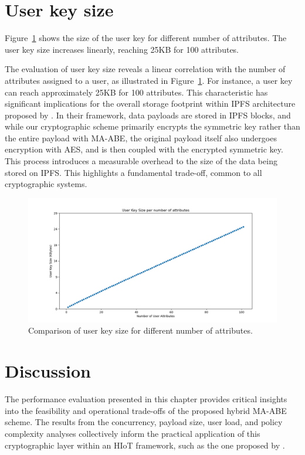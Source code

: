 \documentclass[cic,tc,english]{iiufrgs}
\numberwithin{algorithm}{chapter}
\begin{document}
        
        \section{User key size}
            \label{sec:keysize}
            Figure~\ref{fig:user_key_size} shows the size of the user key for different number of attributes. The user key size increases linearly, reaching 25KB for 100 attributes.

            The evaluation of user key size reveals a linear correlation with the number of attributes assigned to a user, as illustrated in Figure~\ref{fig:user_key_size}. For instance, a user key can reach approximately 25KB for 100 attributes. This characteristic has significant implications for the overall storage footprint within IPFS architecture proposed by \citet{laura2023}. In their framework, data payloads are stored in IPFS blocks, and while our cryptographic scheme primarily encrypts the symmetric key rather than the entire payload with MA-ABE, the original payload itself also undergoes encryption with AES, and is then coupled with the encrypted symmetric key. This process introduces a measurable overhead to the size of the data being stored on IPFS. This highlights a fundamental trade-off, common to all cryptographic systems.

            \begin{figure}
                \centering
                \includegraphics[width=\textwidth]{images/key_size_analysis/user_key_size_analysis.png}
                \caption{Comparison of user key size for different number of attributes.}
                \label{fig:user_key_size}
            \end{figure}


        \section{Discussion}
            \label{sec:discussion}
            The performance evaluation presented in this chapter provides critical insights into the feasibility and operational trade-offs of the proposed hybrid MA-ABE scheme. The results from the concurrency, payload size, user load, and policy complexity analyses collectively inform the practical application of this cryptographic layer within an HIoT framework, such as the one proposed by \citet{laura2023}.
\end{document}
